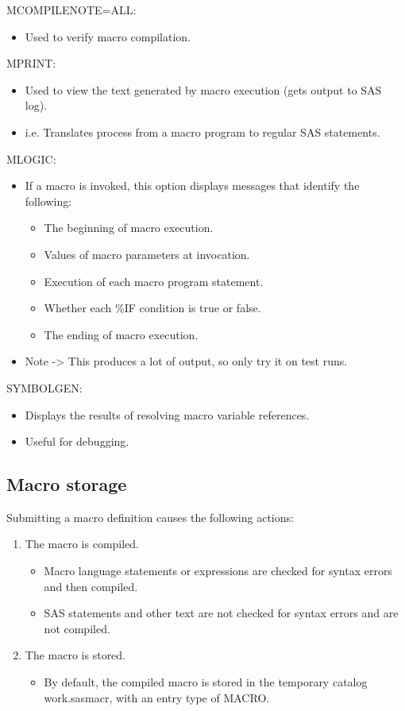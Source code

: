 \documentclass[11pt, oneside]{article}
\begin{document}
MCOMPILENOTE=ALL:
\begin{itemize}
\item Used to verify macro compilation.
\end{itemize}

MPRINT:
\begin{itemize}
\item Used to view the text generated by macro execution (gets output to SAS log).
\item i.e. Translates process from a macro program to regular SAS statements.
\end{itemize}

MLOGIC:
\begin{itemize}
\item If a macro is invoked, this option displays messages that identify the following:
	\begin{itemize}
	\item The beginning of macro execution.
	\item Values of macro parameters at invocation.
	\item Execution of each macro program statement.
	\item Whether each \%IF condition is true or false.
	\item The ending of macro execution.
	\end{itemize}
\item Note -> This produces a lot of output, so only try it on test runs.
\end{itemize}

SYMBOLGEN:
\begin{itemize}
\item Displays the results of resolving macro variable references.
\item Useful for debugging.
\end{itemize}

\subsection{Macro storage}

Submitting a macro definition causes the following actions:
\begin{enumerate}
\item The macro is compiled.
	\begin{itemize}
	\item Macro language statements or expressions are checked for syntax errors and then compiled.
	\item SAS statements and other text are not checked for syntax errors and are not compiled.
	\end{itemize}
\item The macro is stored.
	\begin{itemize}
	\item By default, the compiled macro is stored in the temporary catalog work.sasmacr, with an entry type of MACRO.
	\end{itemize}
\end{enumerate}
\end{document}
